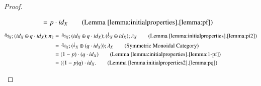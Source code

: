 \begin{proof}
\begin{enumerate}
\begin{align*}
&= p\cdot \id{X} \tag{Lemma \ref{lemma:initialproperties}.\ref{lemma:pf}}
\end{align*}
\begin{align*}
\diagp{X}; (\id{X} \oplus q\cdot \id{X}) ; \pi_2 &=\, \diagp{X}; (\id{X} \oplus q\cdot \id{X}) ; (\bang{X}\oplus \id{X});\lunit{X} \tag{Lemma \ref{lemma:initialproperties}.\ref{lemma:pi2}}\\
&=\, \diagp{X}; ( \bang{X}\oplus( q\cdot \id{X}) ) ; \lunit{X} \tag{Symmetric Monoidal Category}\\
&= (1-p)\cdot (q \cdot \id{X}) \tag{Lemma \ref{lemma:initialproperties}.\ref{lemma:1-pf}}\\
&= ((1-p)q) \cdot \id{X}. \tag{Lemma \ref{lemma:initialproperties2}.\ref{lemma:pq}}
\end{align*}
\end{enumerate}
\end{proof}




